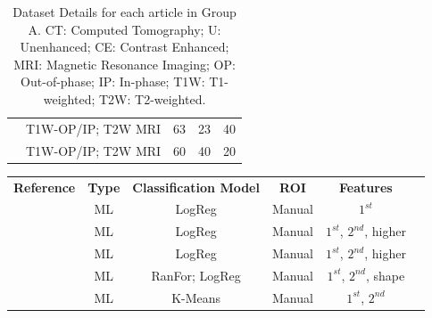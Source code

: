 \documentclass[11pt]{article}
\begin{document}
\begin{table}[]
\begin{tabular}{ccccc}
        \cite{Tu2020}                       & T1W-OP/IP; T2W MRI                       & 63                                                 & 23                & 40             \\
        \cite{Romeo2018}                    & T1W-OP/IP; T2W MRI                       & 60                                                 & 40                & 20
        \\\bottomrule
    \end{tabular}
    \caption{Dataset Details for each article in Group A. CT: Computed Tomography; U: Unenhanced; CE: Contrast Enhanced; MRI: Magnetic Resonance Imaging; OP: Out-of-phase; IP: In-phase; T1W: T1-weighted; T2W: T2-weighted.}
    \label{tab:data_A}
\end{table}

\begin{table}[]
    \centering
    \begin{tabular}{cccccc}\toprule
        \multirow{2}{*}{\textbf{Reference}} & \multirow{2}{*}{\textbf{Type}} & \multirow{2}{*}{\textbf{Classification Model}} & \multirow{2}{*}{\textbf{ROI}} & \multirow{2}{*}{\textbf{Features}} \\
        \\\midrule
        \cite{Tu2018}                       & ML                             & LogReg                                         & Manual                        & $1^{st}$                           \\
        \cite{Yi20181}                      & ML                             &
        LogReg                              & Manual                         & $1^{st}$, $2^{nd}$, higher                                                                                          \\
        \cite{Yi2018}                       & ML                             &
        LogReg                              & Manual
                                            & $1^{st}$, $2^{nd}$, higher                                                                                                                           \\
        \cite{Elmohr2019}                   & ML                             & RanFor; LogReg                                 & Manual                        & $1^{st}$, $2^{nd}$, shape          \\
        \cite{Torresan2021}                 & ML                             & K-Means                                        & Manual                        & $1^{st}$, $2^{nd}$                 \\

\end{tabular}
\end{table}
\end{document}

